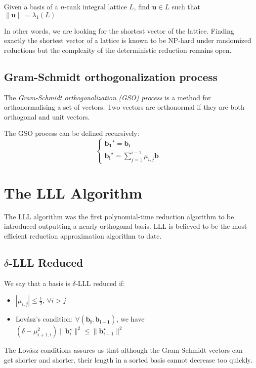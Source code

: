 \documentclass[10pt, a4paper]{article}
\renewcommand{\vec}[1]{\mathbf{#1}}
\begin{document}
Given a basis of a $n$-rank integral lattice $L$, find $\vec{u} \in L$ such that $\|\vec{u}\| = \lambda_1 (L)$

In other words, we are looking for the shortest vector of the lattice. Finding exactly the shortest vector of a lattice is known to be NP-hard under randomized reductions\cite{Ajtai:1998:SVP} but the complexity of the deterministic reduction remains open.

\subsection{Gram-Schmidt orthogonalization process}
The \emph{Gram-Schmidt orthogonalization (\emph GSO) process} is a method for orthonormalising a set of vectors. Two vectors are orthonormal if they are both orthogonal and unit vectors. 

The GSO process  can be defined recursively:
\[
\begin{cases}
\vec{b_1}^{\star} = \vec{b_i}  \\
\vec{b_i}^{\star} = \displaystyle\sum^{i-1}_{j=1} \mu_{i,j} \vec{b}
\end{cases}
\]

\section{The LLL Algorithm}

The LLL algorithm\cite{lllpaper} was the first polynomial-time reduction algorithm to be introduced outputting a nearly orthogonal basis. LLL is believed to be the most efficient reduction approximation algorithm to date\cite{lllAlgorithm}.

\subsection{$\delta$-LLL Reduced}
We say that a basis is $\delta$-LLL reduced if:
\begin{itemize}
\item $| \mu_{i,j}| \leq \frac{1}{2} \text{, } \forall i > j$
\item Lovász's condition: $\forall (\vec{b_i, b_{i+1}})$, we have $(\delta - \mu^2_{i+1,i}) \|\vec{b}^{\star}_{i}\|^2 \leq \| \vec{b}^{\star}_{i+1} \|^2$
\end{itemize}

The Lovász conditions assures us that although the Gram-Schmidt vectors can get shorter and shorter, their length in a sorted basis cannot decrease too quickly.
\end{document}
